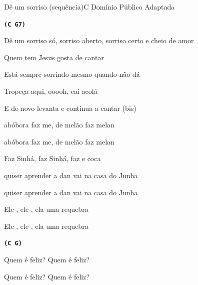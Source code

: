 \documentclass[a4,12pt,oneside]{book}
\newcommand{\RevDate}{\today}
\newcommand{\NotCCLIed}{\relax}
\renewcommand{\SBPubDom}{Domínio Público}
\begin{document}
\begin{song}{Dê um sorriso (sequência)}{C}
  {\SBPubDom}
  {Adaptada}
  {}
  {\NotCCLIed}
  
	\renewcommand{\RevDate}{24 de julho de 2014}
 
	
	\ifChordBk
	{\vspace{-2em}\flushright{\Cchord \quad \Gschord \quad \Gchord \quad \Fchord\\}}
	\vspace{-1ex}
	\fi
	
	\begin{SBVerse*}
		\textbf{\texttt{(C G7)}}
		
		Dê um sorriso só, sorriso aberto, sorriso certo e cheio de amor
		
		Quem tem Jesus gosta de cantar
		
		Está sempre sorrindo mesmo quando não dá
		
		Tropeça aqui, ooooh, cai acolá
		
		E de novo levanta e continua a cantar (bis)
	\end{SBVerse*}
	
	\begin{SBVerse*}	
		 abóbora faz me, de melão faz melan 

		 abóbora faz me, de melão faz melan 
				
		Faz  Sinhá, faz  Sinhá, faz  e coca
		
		 quiser aprender a dan vai na casa do Junha

		 quiser aprender a dan vai na casa do Junha

		Ele , ele , ela  uma requebra
		
		Ele , ele , ela  uma requebra
	\end{SBVerse*}
	
	\ifChordBk
	\clearpage
	\fi
	
	\begin{SBVerse*}
		\begin{SBChorus} {\normalsize\texttt{\textbf{(C G)}}}
					
			Quem é feliz? Quem é feliz? 
		
			Quem é feliz? Quem é feliz?
		\end{SBChorus}
		

\end{SBVerse*}
\end{song}
\end{document}
